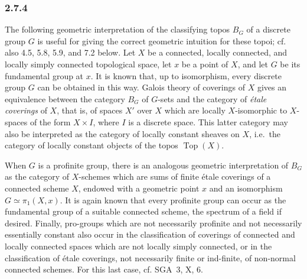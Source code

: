 \documentclass[11pt]{article}
\newcommand{\Top}{\operatorname{Top}}
\newcommand{\ie}{i.e.}
\begin{document}
\subsubsection*{2.7.4}
The following geometric interpretation of the classifying topos \(B_G\) of a discrete group \(G\) is useful for giving the correct geometric intuition for these topoi; cf. also 4.5, 5.8, 5.9, and 7.2 below. Let \(X\) be a connected, locally connected, and locally simply connected topological space, let \(x\) be a point of \(X\), and let \(G\) be its fundamental group at \(x\). It is known that, up to isomorphism, every discrete group \(G\) can be obtained in this way. Galois theory of coverings of \(X\) gives an equivalence between the category \(B_G\) of \(G\)-sets and the category of \emph{\'etale coverings} of \(X\), that is, of spaces \(X'\) over \(X\) which are locally \(X\)-isomorphic to \(X\)-spaces of the form \(X\times I\), where \(I\) is a discrete space. This latter category may also be interpreted as the category of locally constant sheaves on \(X\), \ie\ the category of locally constant objects of the topos \(\Top(X)\).

When \(G\) is a profinite group, there is an analogous geometric interpretation of \(B_G\) as the category of \(X\)-schemes which are sums of finite \'etale coverings of a connected scheme \(X\), endowed with a geometric point \(x\) and an isomorphism \(G\simeq\pi_1(X,x)\). It is again known that every profinite group can occur as the fundamental group of a suitable connected scheme, the spectrum of a field if desired. Finally, pro-groups which are not necessarily profinite and not necessarily essentially constant also occur in the classification of coverings of connected and locally connected spaces which are not locally simply connected, or in the classification of \'etale coverings, not necessarily finite or ind-finite, of non-normal connected schemes. For this last case, cf. SGA~3, X, 6.
\end{document}
